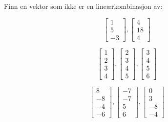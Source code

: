 \begin{oppgave}
Finn en vektor som ikke er en lineærkombinasjon av:
\begin{punkt}
	$$
	\begin{bmatrix}
	1\\
	5\\
	-3
	\end{bmatrix},
	\begin{bmatrix}
	4\\
	18\\
	4
	\end{bmatrix}
	$$
\end{punkt}
\begin{punkt}
$$
\begin{bmatrix}
1\\
2\\
3\\
4
\end{bmatrix},
\begin{bmatrix}
2\\
3\\
4\\
5
\end{bmatrix},
\begin{bmatrix}
3\\
4\\
5\\
6
\end{bmatrix}
$$
\end{punkt}

\begin{punkt}
	$$
	\begin{bmatrix}
	8  \\
	-8 \\
	-4 \\
	-6
	\end{bmatrix},
	\begin{bmatrix}
	-7  \\
	-7 \\
	5 \\
	6
	\end{bmatrix},
	\begin{bmatrix}
	0  \\
	3 \\
	-8 \\
	-4
	\end{bmatrix}
	$$
\end{punkt}
\end{oppgave}

